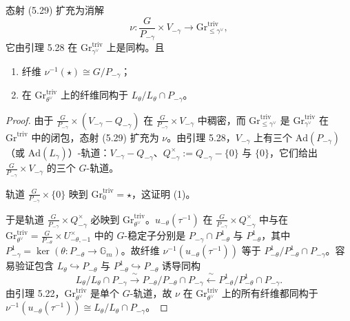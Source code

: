 \begin{lemma}
态射 (5.29) 扩充为消解
\[
\nu:\frac{G}{P_{-\gamma}}\times V_{-\gamma}\to\mathrm{Gr}^{\mathrm{triv}}_{\le\gamma^\vee},
\]
它由引理 5.28 在 $\mathrm{Gr}^{\mathrm{triv}}_{\gamma^\vee}$ 上是同构。且
\begin{enumerate}[label=(\arabic*), leftmargin=1.9em, itemsep=.2em]
\item 纤维 $\nu^{-1}(\star)\cong G/P_{-\gamma}$；
\item 在 $\mathrm{Gr}^{\mathrm{triv}}_{\theta^\vee}$ 上的纤维同构于 $L_\theta/L_\theta\cap P_{-\gamma}$。
\end{enumerate}
\end{lemma}

\begin{proof}
由于 $\frac{G}{P_{-\gamma}}\times(V_{-\gamma}-Q_{-\gamma})$ 在 $\frac{G}{P_{-\gamma}}\times V_{-\gamma}$ 中稠密，而 $\mathrm{Gr}^{\mathrm{triv}}_{\le\gamma^\vee}$ 是 $\mathrm{Gr}^{\mathrm{triv}}_{\gamma^\vee}$ 在 $\mathrm{Gr}^{\mathrm{triv}}$ 中的闭包，态射 (5.29) 扩充为 $\nu$。由引理 5.28，$V_{-\gamma}$ 上有三个 $\mathrm{Ad}(P_{-\gamma})$（或 $\mathrm{Ad}(L_\gamma)$）-轨道：$V_{-\gamma}-Q_{-\gamma}$、$Q^\times_{-\gamma}:=Q_{-\gamma}-\{0\}$ 与 $\{0\}$，它们给出 $\frac{G}{P_{-\gamma}}\times V_{-\gamma}$ 的三个 $G$-轨道。

轨道 $\frac{G}{P_{-\gamma}}\times\{0\}$ 映到 $\mathrm{Gr}^{\mathrm{triv}}_0=\star$，这证明 (1)。

于是轨道 $\frac{G}{P_{-\gamma}}\times Q^\times_{-\gamma}$ 必映到 $\mathrm{Gr}^{\mathrm{triv}}_{\theta^\vee}$。$u_{-\theta}(\tau^{-1})$ 在 $\frac{G}{P_{-\gamma}}\times Q^\times_{-\gamma}$ 中与在 $\mathrm{Gr}^{\mathrm{triv}}_{\theta^\vee}=\frac{G}{P_{-\theta}}\times U^\times_{-\theta,-1}$ 中的 $G$-稳定子分别是 $P_{-\gamma}\cap P^1_{-\theta}$ 与 $P^1_{-\theta}$，其中 $P^1_{-\gamma}=\ker(\theta:P_{-\theta}\to\mathbb{G}_m)$。故纤维 $\nu^{-1}(u_{-\theta}(\tau^{-1}))$ 等于 $P^1_{-\theta}/P^1_{-\theta}\cap P_{-\gamma}$。容易验证包含 $L_\theta\hookrightarrow P_{-\theta}$ 与 $P^1_{-\theta}\hookrightarrow P_{-\theta}$ 诱导同构
\[
L_\theta/L_\theta\cap P_{-\gamma}\xrightarrow{\ \sim\ }P_{-\theta}/P_{-\theta}\cap P_{-\gamma}\xleftarrow{\ \sim\ }P^1_{-\theta}/P^1_{-\theta}\cap P_{-\gamma}.
\]
由引理 5.22，$\mathrm{Gr}^{\mathrm{triv}}_{\theta^\vee}$ 是单个 $G$-轨道，故 $\nu$ 在 $\mathrm{Gr}^{\mathrm{triv}}_{\theta^\vee}$ 上的所有纤维都同构于 $\nu^{-1}(u_{-\theta}(\tau^{-1}))\cong L_\theta/L_\theta\cap P_{-\gamma}$。
\end{proof}

